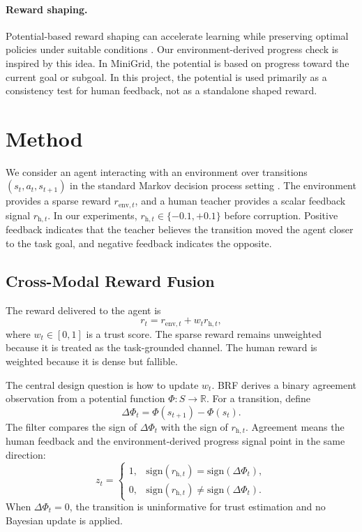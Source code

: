 \documentclass[11pt]{article}
\begin{document}
\paragraph{Reward shaping.}
Potential-based reward shaping can accelerate learning while preserving optimal policies under suitable conditions \cite{ng1999policy,wiewiora2011potential}. Our environment-derived progress check is inspired by this idea. In MiniGrid, the potential is based on progress toward the current goal or subgoal. In this project, the potential is used primarily as a consistency test for human feedback, not as a standalone shaped reward.

\section{Method}

We consider an agent interacting with an environment over transitions $(s_t,a_t,s_{t+1})$ in the standard Markov decision process setting \cite{sutton2018reinforcement}. The environment provides a sparse reward $r_{\mathrm{env},t}$, and a human teacher provides a scalar feedback signal $r_{\mathrm{h},t}$. In our experiments, $r_{\mathrm{h},t}\in\{-0.1,+0.1\}$ before corruption. Positive feedback indicates that the teacher believes the transition moved the agent closer to the task goal, and negative feedback indicates the opposite.

\subsection{Cross-Modal Reward Fusion}

The reward delivered to the agent is
\begin{equation}
r_t = r_{\mathrm{env},t} + w_t r_{\mathrm{h},t},
\label{eq:reward}
\end{equation}
where $w_t\in[0,1]$ is a trust score. The sparse reward remains unweighted because it is treated as the task-grounded channel. The human reward is weighted because it is dense but fallible.

The central design question is how to update $w_t$. BRF derives a binary agreement observation from a potential function $\Phi:S\rightarrow\mathbb{R}$. For a transition, define
\begin{equation}
\Delta\Phi_t=\Phi(s_{t+1})-\Phi(s_t).
\end{equation}
The filter compares the sign of $\Delta\Phi_t$ with the sign of $r_{\mathrm{h},t}$. Agreement means the human feedback and the environment-derived progress signal point in the same direction:
\begin{equation}
z_t =
\begin{cases}
1, & \mathrm{sign}(r_{\mathrm{h},t})=\mathrm{sign}(\Delta\Phi_t),\\
0, & \mathrm{sign}(r_{\mathrm{h},t})\neq \mathrm{sign}(\Delta\Phi_t).
\end{cases}
\end{equation}
When $\Delta\Phi_t=0$, the transition is uninformative for trust estimation and no Bayesian update is applied.
\end{document}
